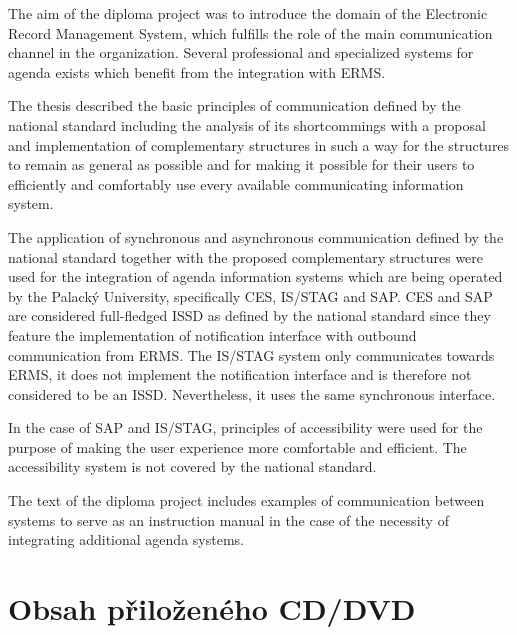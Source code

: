 \documentclass[
  master,
  field=ainfp,
  biblatex,
  language=czech,
  glossaries,
  theorems=false,
  index
]{kidiplom}
\begin{document}
\begin{kiconclusions}[english]
The aim of the diploma project was to introduce the domain of the Electronic
Record Management System, which fulfills the role of the main communication channel
in the organization. Several professional and specialized systems for agenda exists which 
benefit from the integration with ERMS.

The thesis described the basic principles of communication defined by the national standard including the analysis of its shortcommings with a proposal and implementation of complementary structures in such a way for the structures to remain as general as possible and for making it possible for their users to efficiently and comfortably use every available communicating information system.

The application of synchronous and asynchronous communication defined by the national standard together with the proposed complementary structures were used for the integration of agenda information systems which are being operated by the Palacký University, specifically CES, IS/STAG and SAP. CES and SAP are considered full-fledged ISSD as defined by the national standard since they feature the implementation of notification interface with outbound communication from ERMS. The IS/STAG system only communicates towards ERMS, it does not implement the notification interface and is therefore not considered to be an ISSD. Nevertheless, it uses the same synchronous interface.

In the case of SAP and IS/STAG, principles of accessibility were used for the purpose of making the user experience more comfortable and efficient. The accessibility system is not covered by the national standard.

The text of the diploma project includes examples of communication between systems to serve as an instruction manual in the case of the necessity of integrating additional agenda systems.
\end{kiconclusions}

\appendix

\section{Obsah přiloženého CD/DVD} \label{sec:ObsahCD}
\end{document}
